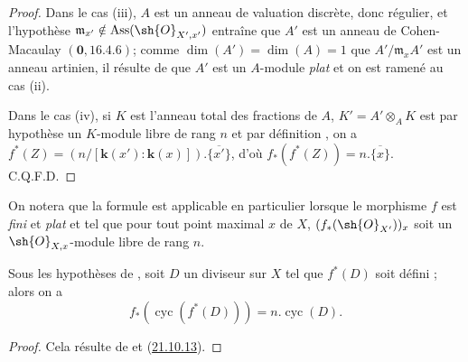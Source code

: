\begin{proof}
Dans le cas (iii), $A$ est un anneau de valuation discrète, donc régulier, et l'hypothèse $\mathfrak{m}_{x'}\notin\operatorname{Ass}(\sh{O}_{X',x'})$ entraîne que $A'$ est un anneau de Cohen-Macaulay $(\mathbf{0},16.4.6)$;
comme $\dim(A')=\dim(A)=1$ que $A'/\mathfrak{m}_xA'$ est un anneau artinien, il résulte de  que $A'$ est un $A$-module \emph{plat} et on est ramené au cas (ii).

Dans le cas (iv), si $K$ est l'anneau total des fractions de $A$, $K'=A'\otimes_AK$ est par hypothèse un $K$-module libre de rang $n$ et par définition , on a
$f^*(Z)=(n/[\boldsymbol{k}(x'): \boldsymbol{k}(x)]).\overline{\{x'\}}$,
d'où $f_*(f^*(Z))=n.\overline{\{x\}}$. C.Q.F.D.
\end{proof}

On notera que la formule  est applicable en particulier lorsque le morphisme $f$ est \emph{fini} et \emph{plat} et tel que pour tout point maximal $x$ de $X$, $(f_*(\sh{O}_{X'}))_x$ soit un $\sh{O}_{X,x}$-module libre de rang $n$.

\begin{corollary}[21.10.19]
\label{IV.21.10.19}
Sous les hypothèses de , soit $D$ un diviseur sur $X$ tel que $f^*(D)$ soit défini ; alors on a
\[
\label{IV.21.10.19.1}
  f_*(\operatorname{cyc}(f^*(D)))=n.\operatorname{cyc}(D).
  \tag{21.10.19.1}
\]
\end{corollary}

\begin{proof}
Cela résulte de  et (\hyperref[IV.21.10.13bis]{21.10.13}).
\end{proof}

